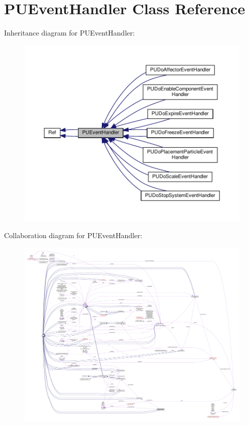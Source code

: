 \hypertarget{classPUEventHandler}{}\section{P\+U\+Event\+Handler Class Reference}
\label{classPUEventHandler}


Inheritance diagram for P\+U\+Event\+Handler\+:
\nopagebreak
\begin{figure}[H]
\begin{center}
\leavevmode
\includegraphics[width=350pt]{classPUEventHandler__inherit__graph}
\end{center}
\end{figure}


Collaboration diagram for P\+U\+Event\+Handler\+:
\nopagebreak
\begin{figure}[H]
\begin{center}
\leavevmode
\includegraphics[width=350pt]{classPUEventHandler__coll__graph}
\end{center}
\end{figure}
